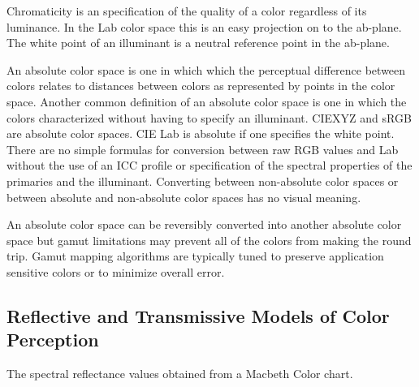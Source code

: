 \documentclass{amsart}
\theoremstyle{definition}
\theoremstyle{remark}
\numberwithin{equation}{section}
\begin{document}
Chromaticity is an specification of the quality of a color regardless of its luminance. In the Lab color space this is an easy projection on to the ab-plane. The white point of an illuminant is a neutral reference point in the ab-plane.

An absolute color space is one in which which the perceptual difference between colors relates to distances between colors as represented by points in the color space.  Another common definition of an absolute color space is one in which the colors characterized without having to specify an illuminant.
CIEXYZ and sRGB are absolute color spaces. CIE Lab is absolute if one specifies the white point.
There are no simple formulas for conversion between raw RGB values and Lab without the use of an ICC profile or specification of the spectral properties of the primaries and the illuminant.
Converting between non-absolute color spaces or between absolute and non-absolute color spaces has no visual meaning.

An absolute color space can be reversibly converted into another absolute color space but gamut limitations may prevent all of the colors from making the round trip.  Gamut mapping algorithms are typically tuned to preserve application sensitive colors or to minimize overall error.

\subsection{Reflective and Transmissive Models of Color Perception}
The spectral reflectance values obtained from a Macbeth Color chart. 
\end{document}
